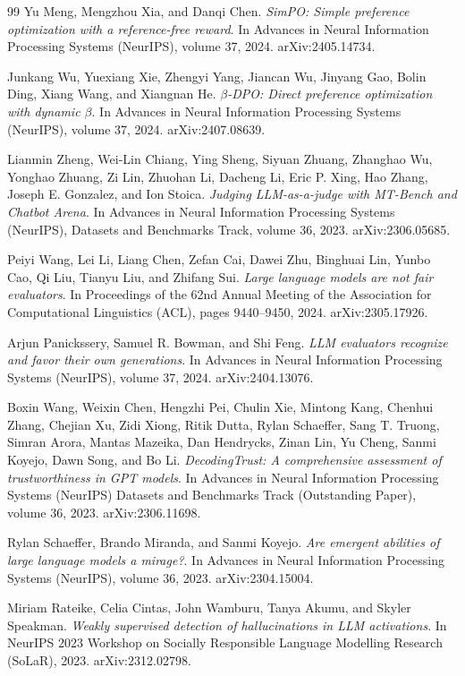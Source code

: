\begin{thebibliography}{99}
Yu Meng, Mengzhou Xia, and Danqi Chen.
\textit{SimPO: Simple preference optimization with a reference-free reward}.
In Advances in Neural Information Processing Systems (NeurIPS), volume 37, 2024.
arXiv:2405.14734.

Junkang Wu, Yuexiang Xie, Zhengyi Yang, Jiancan Wu, Jinyang Gao, Bolin Ding, Xiang Wang, and Xiangnan He.
\textit{$\beta$-DPO: Direct preference optimization with dynamic $\beta$}.
In Advances in Neural Information Processing Systems (NeurIPS), volume 37, 2024.
arXiv:2407.08639.

Lianmin Zheng, Wei-Lin Chiang, Ying Sheng, Siyuan Zhuang, Zhanghao Wu, Yonghao Zhuang, Zi Lin, Zhuohan Li, Dacheng Li, Eric P. Xing, Hao Zhang, Joseph E. Gonzalez, and Ion Stoica.
\textit{Judging LLM-as-a-judge with MT-Bench and Chatbot Arena}.
In Advances in Neural Information Processing Systems (NeurIPS), Datasets and Benchmarks Track, volume 36, 2023.
arXiv:2306.05685.

Peiyi Wang, Lei Li, Liang Chen, Zefan Cai, Dawei Zhu, Binghuai Lin, Yunbo Cao, Qi Liu, Tianyu Liu, and Zhifang Sui.
\textit{Large language models are not fair evaluators}.
In Proceedings of the 62nd Annual Meeting of the Association for Computational Linguistics (ACL), pages 9440--9450, 2024.
arXiv:2305.17926.

Arjun Panickssery, Samuel R. Bowman, and Shi Feng.
\textit{LLM evaluators recognize and favor their own generations}.
In Advances in Neural Information Processing Systems (NeurIPS), volume 37, 2024.
arXiv:2404.13076.

Boxin Wang, Weixin Chen, Hengzhi Pei, Chulin Xie, Mintong Kang, Chenhui Zhang, Chejian Xu, Zidi Xiong, Ritik Dutta, Rylan Schaeffer, Sang T. Truong, Simran Arora, Mantas Mazeika, Dan Hendrycks, Zinan Lin, Yu Cheng, Sanmi Koyejo, Dawn Song, and Bo Li.
\textit{DecodingTrust: A comprehensive assessment of trustworthiness in GPT models}.
In Advances in Neural Information Processing Systems (NeurIPS) Datasets and Benchmarks Track (Outstanding Paper), volume 36, 2023.
arXiv:2306.11698.

Rylan Schaeffer, Brando Miranda, and Sanmi Koyejo.
\textit{Are emergent abilities of large language models a mirage?}.
In Advances in Neural Information Processing Systems (NeurIPS), volume 36, 2023.
arXiv:2304.15004.

Miriam Rateike, Celia Cintas, John Wamburu, Tanya Akumu, and Skyler Speakman.
\textit{Weakly supervised detection of hallucinations in LLM activations}.
In NeurIPS 2023 Workshop on Socially Responsible Language Modelling Research (SoLaR), 2023.
arXiv:2312.02798.


\end{thebibliography}
